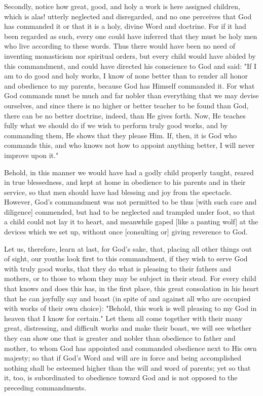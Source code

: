 Secondly, notice how great, good, and holy a work is here assigned
children, which is alas! utterly neglected and disregarded, and no one
perceives that God has commanded it or that it is a holy, divine Word
and doctrine. For if it had been regarded as such, every one could have
inferred that they must be holy men who live according to these words.
Thus there would have been no need of inventing monasticism nor
spiritual orders, but every child would have abided by this
commandment, and could have directed his conscience to God and said:
"If I am to do good and holy works, I know of none better than to
render all honor and obedience to my parents, because God has Himself
commanded it. For what God commands must be much and far nobler than
everything that we may devise ourselves, and since there is no higher
or better teacher to be found than God, there can be no better
doctrine, indeed, than He gives forth. Now, He teaches fully what we
should do if we wish to perform truly good works, and by commanding
them, He shows that they please Him. If, then, it is God who commands
this, and who knows not how to appoint anything better, I will never
improve upon it."

Behold, in this manner we would have had a godly child properly
taught, reared in true blessedness, and kept at home in obedience to
his parents and in their service, so that men should have had blessing
and joy from the spectacle. However, God's commandment was not
permitted to be thus [with such care and diligence] commended, but had
to be neglected and trampled under foot, so that a child could not lay
it to heart, and meanwhile gaped [like a panting wolf] at the devices
which we set up, without once [consulting or] giving reverence to God.

Let us, therefore, learn at last, for God's sake, that, placing all
other things out of sight, our youths look first to this commandment,
if they wish to serve God with truly good works, that they do what is
pleasing to their fathers and mothers, or to those to whom they may be
subject in their stead. For every child that knows and does this has,
in the first place, this great consolation in his heart that he can
joyfully say and boast (in spite of and against all who are occupied
with works of their own choice): "Behold, this work is well pleasing to
my God in heaven that I know for certain." Let them all come together
with their many great, distressing, and difficult works and make their
boast, we will see whether they can show one that is greater and
nobler than obedience to father and mother, to whom God has appointed
and commanded obedience next to His own majesty; so that if God's Word
and will are in force and being accomplished nothing shall be esteemed
higher than the will and word of parents; yet so that it, too, is
subordinated to obedience toward God and is not opposed to the
preceding commandments.


